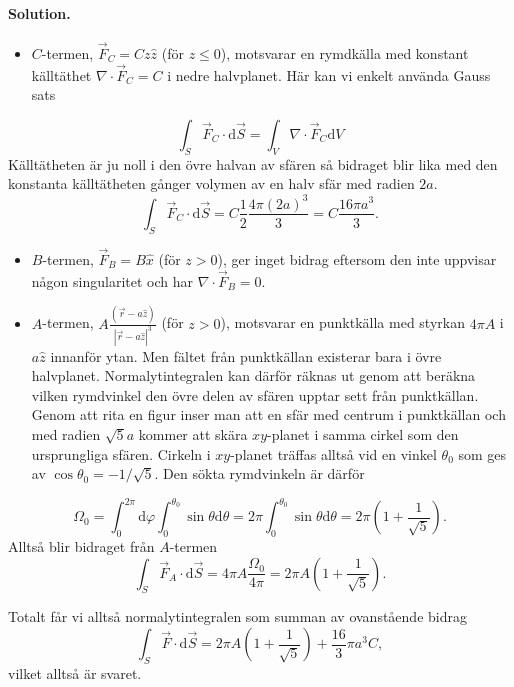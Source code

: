 \documentclass[%
oneside,                 %
final,                   %
10pt]{article}
\newenvironment{doconceexercise}{}{}
\begin{document}
\begin{doconceexercise}


\paragraph{Solution.}
\begin{itemize}
\item $C$-termen, $\vec{F}_C = C z \hat{z}$ (för $z \le 0$), motsvarar en rymdkälla med konstant källtäthet $\nabla \cdot \vec{F}_C = C$ i nedre halvplanet. Här kan vi enkelt använda Gauss sats
\end{itemize}

\noindent
$$
\int_S \vec{F}_C \cdot \mbox{d}\vec{S} = \int_V \nabla \cdot \vec{F}_C \mbox{d}V
$$
Källtätheten är ju noll i den övre halvan av sfären så bidraget blir lika med den konstanta källtätheten gånger volymen av en halv sfär med radien $2a$.
$$
\int_S \vec{F}_C \cdot \mbox{d}\vec{S} = C \frac{1}{2} \frac{4 \pi (2a)^3}{3} = C \frac{16 \pi a^3}{3}.
$$

\begin{itemize}
\item $B$-termen, $\vec{F}_B = B \hat{x}$ (för $z > 0$), ger inget bidrag eftersom den inte uppvisar någon singularitet och har $\nabla \cdot \vec{F}_B = 0$.

\item $A$-termen, $A \frac{(\vec{r} - a\hat{z})}{| \vec{r} - a \hat{z}|^3}$ (för $z > 0$), motsvarar en punktkälla med styrkan $4 \pi A$ i $a \hat{z}$ innanför ytan. Men fältet från punktkällan existerar bara i övre halvplanet. Normalytintegralen kan därför räknas ut genom att beräkna vilken rymdvinkel den övre delen av sfären upptar sett från punktkällan. Genom att rita en figur inser man att en sfär med centrum i punktkällan och med radien $\sqrt{5}a$ kommer att skära $xy$-planet i samma cirkel som den ursprungliga sfären. Cirkeln i $xy$-planet träffas alltså vid en vinkel $\theta_0$ som ges av $\cos\theta_0 = -1/\sqrt{5}$. Den sökta rymdvinkeln är därför
\end{itemize}

\noindent
$$
\Omega_0 = \int_0^{2\pi}\mbox{d}\varphi \int_0^{\theta_0} \sin\theta \mbox{d}\theta = 2\pi \int_0^{\theta_0} \sin\theta \mbox{d}\theta = 2\pi \left( 1 + \frac{1}{\sqrt{5}} \right).
$$
Alltså blir bidraget från $A$-termen
$$
\int_S \vec{F}_A \cdot \mbox{d}\vec{S} = 4 \pi A \frac{\Omega_0}{4\pi} = 2 \pi A \left( 1 + \frac{1}{\sqrt{5}} \right).
$$

Totalt får vi alltså normalytintegralen som summan av ovanstående bidrag 
$$
\int_S \vec{F} \cdot \mbox{d}\vec{S} = 2 \pi A \left(1 + \frac{1}{\sqrt{5}} \right) + \frac{16}{3} \pi a^3 C,
$$
vilket alltså är svaret.


\end{doconceexercise}
\end{document}
